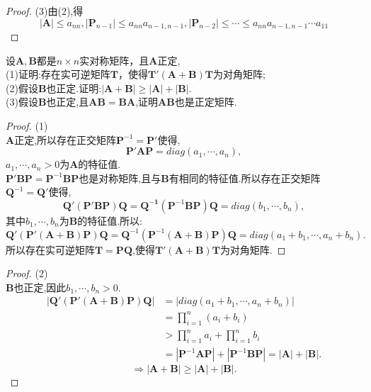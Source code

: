 \documentclass[lang=cn,11pt,normal]{elegantbook}
\begin{document}
	\begin{proof}
		(3)由(2),得
		$$
		|\boldsymbol{A}|\leq a_{nn},|\boldsymbol{P}_{n-1}|\leq a_{nn}a_{n-1,n-1},|\boldsymbol{P}_{n-2}|\leq \cdots\leq a_{nn}a_{n-1,n-1}\cdots a_{11}
		$$
	\end{proof}
	\begin{exercise}
		设$\boldsymbol{A},\boldsymbol{B}$都是$n\times n$实对称矩阵，且$\boldsymbol{A}$正定,\\
		(1)证明:存在实可逆矩阵$\boldsymbol{T}$，使得$\boldsymbol{T}'(\boldsymbol{A}+\boldsymbol{B})\boldsymbol{T}$为对角矩阵;\\
		(2)假设$\boldsymbol{B}$也正定.证明:$|\boldsymbol{A}+\boldsymbol{B}|\geq|\boldsymbol{A}|+|\boldsymbol{B}|.$\\
		(3)假设$\boldsymbol{B}$也正定,且$\boldsymbol{A}\boldsymbol{B}=\boldsymbol{B}\boldsymbol{A}$,证明$\boldsymbol{A}\boldsymbol{B}$也是正定矩阵.
	\end{exercise}
	\begin{proof}
		(1)\\
		$\boldsymbol{A}$正定,所以存在正交矩阵$\boldsymbol{P}^{-1}=\boldsymbol{P'}$使得,
		$$
		\boldsymbol{P}'\boldsymbol{AP}=diag(a_1,\cdots,a_n),
		$$
		$a_1,\cdots,a_n>0$为$\boldsymbol{A}$的特征值.\\
		$\boldsymbol{P}'\boldsymbol{BP}=\boldsymbol{P}^{-1}\boldsymbol{BP}$也是对称矩阵,且与$\boldsymbol{B}$有相同的特征值.所以存在正交矩阵$\boldsymbol{Q}^{-1}=\boldsymbol{Q}'$使得,
		$$
		\boldsymbol{Q}'(\boldsymbol{P}'\boldsymbol{BP})\boldsymbol{Q}=\boldsymbol{Q^{-1}}(\boldsymbol{P}^{-1}\boldsymbol{BP})\boldsymbol{Q}=diag(b_1,\cdots,b_n),
		$$
		其中$b_1,\cdots,b_n$为$\boldsymbol{B}$的特征值.所以:
		$$
		\boldsymbol{Q}'(\boldsymbol{P}'(\boldsymbol{A}+\boldsymbol{B})\boldsymbol{P})\boldsymbol{Q}=\boldsymbol{Q}^{-1}(\boldsymbol{P}^{-1}(\boldsymbol{A}+\boldsymbol{B})\boldsymbol{P})\boldsymbol{Q}=diag(a_1+b_1,\cdots,a_n+b_n).
		$$
		所以存在实可逆矩阵$\boldsymbol{T}=\boldsymbol{PQ}$,使得$\boldsymbol{T}'(\boldsymbol{A}+\boldsymbol{B})\boldsymbol{T}$为对角矩阵.
	\end{proof}
	\begin{proof}
		(2)\\
		$\boldsymbol{B}$也正定,因此$b_1,\cdots,b_n>0$.
		\begin{align*}
			|\boldsymbol{Q}'(\boldsymbol{P}'(\boldsymbol{A}+\boldsymbol{B})\boldsymbol{P})\boldsymbol{Q}|
			&=|diag(a_1+b_1,\cdots,a_n+b_n)|\\
			&=\prod_{i=1}^{n}(a_i+b_i)\\
			&>\prod_{i=1}^{n}a_i+\prod_{i=1}^{n}b_i\\
			&=|\boldsymbol{P}^{-1}\boldsymbol{AP}|+|\boldsymbol{P}^{-1}\boldsymbol{BP}|=|\boldsymbol{A}|+|\boldsymbol{B}|.
			\end{align*}
			$$
			\Rightarrow|\boldsymbol{A}+\boldsymbol{B}|\ge|\boldsymbol{A}|+|\boldsymbol{B}|.
			$$
	\end{proof}
\end{document}

